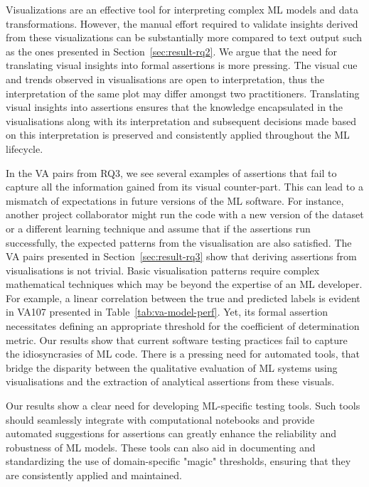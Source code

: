 Visualizations are an effective tool for interpreting complex ML models and data transformations. However, the manual effort required to validate insights derived from these visualizations can be substantially more compared to text output such as the ones presented in Section~\ref{sec:result-rq2}. We argue that the need for translating visual insights into formal assertions is more pressing. The visual cue and trends observed in visualisations are open to interpretation, thus the interpretation of the same plot may differ amongst two practitioners. Translating visual insights into assertions ensures that the knowledge encapsulated in the visualisations along with its interpretation and subsequent decisions made based on this interpretation is preserved and consistently applied throughout the ML lifecycle.

In the VA pairs from RQ3, we see several examples of assertions that fail to capture all the information gained from its visual counter-part. This can lead to a mismatch of expectations in future versions of the ML software. For instance, another project collaborator might run the code with a new version of the dataset or a different learning technique and assume that if the assertions run successfully, the expected patterns from the visualisation are also satisfied. The VA pairs presented in Section~\ref{sec:result-rq3} show that deriving assertions from visualisations is not trivial. Basic visualisation patterns require complex mathematical techniques which may be beyond the expertise of an ML developer. For example, a linear correlation between the true and predicted labels is evident in VA107 presented in Table~\ref{tab:va-model-perf}. Yet, its formal assertion necessitates defining an appropriate threshold for the coefficient of determination metric. Our results show that current software testing practices fail to capture the idiosyncrasies of ML code. There is a pressing need for automated tools, that bridge the disparity between the qualitative evaluation of ML systems using visualisations and the extraction of analytical assertions from these visuals.

Our results show a clear need for developing ML-specific testing tools. Such tools should seamlessly integrate with computational notebooks and provide automated suggestions for assertions can greatly enhance the reliability and robustness of ML models. These tools can also aid in documenting and standardizing the use of domain-specific "magic" thresholds, ensuring that they are consistently applied and maintained.

